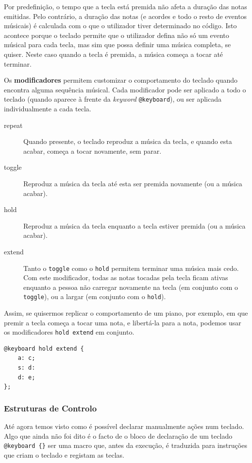 Por predefinição, o tempo que a tecla está premida não afeta a duração das notas emitidas. Pelo contrário, a duração das notas (e acordes e todo o resto de eventos músicais) é calculada com o que o utilizador tiver determinado no código. Isto acontece porque o teclado permite que o utilizador defina não só um evento músical para cada tecla, mas sim que possa definir uma música completa, se quiser. Neste caso quando a tecla é premida, a música começa a tocar até terminar.

Os \textbf{modificadores} permitem customizar o comportamento do teclado quando encontra alguma sequência músical. Cada modificador pode ser aplicado a todo o teclado (quando aparece à frente da \textit{keyword} \texttt{@keyboard}), ou ser aplicada individualmente a cada tecla.

\begin{description}
 \item[repeat] Quando presente, o teclado reproduz a música da tecla, e quando esta acabar, começa a tocar novamente, sem parar.
 \item[toggle] Reproduz a música da tecla até esta ser premida novamente (ou a música acabar).
 \item[hold] Reproduz a música da tecla enquanto a tecla estiver premida (ou a música acabar).
 \item[extend] Tanto o \texttt{toggle} como o \texttt{hold} permitem terminar uma música mais cedo. Com este modificador, todas as notas tocadas pela tecla ficam ativas enquanto a pessoa não carregar novamente na tecla (em conjunto com o \texttt{toggle}), ou a largar (em conjunto com o \texttt{hold}).
\end{description}

Assim, se quisermos replicar o comportamento de um piano, por exemplo, em que premir a tecla começa a tocar uma nota, e libertá-la para a nota, podemos usar os modificadores \texttt{hold extend} em conjunto.

\begin{lstlisting}[caption={Aplicar o modificar \texttt{hold extend} a um teclado inteiro}]
@keyboard hold extend {
    a: c;
    s: d:
    d: e;
};
\end{lstlisting}

\subsubsection{Estruturas de Controlo}
Até agora temos visto como é possível declarar manualmente ações num teclado. Algo que ainda não foi dito é o facto de o bloco de declaração de um teclado \verb|@keyboard {}| ser uma macro que, antes da execução, é traduzida para instruções que criam o teclado e registam as teclas.


